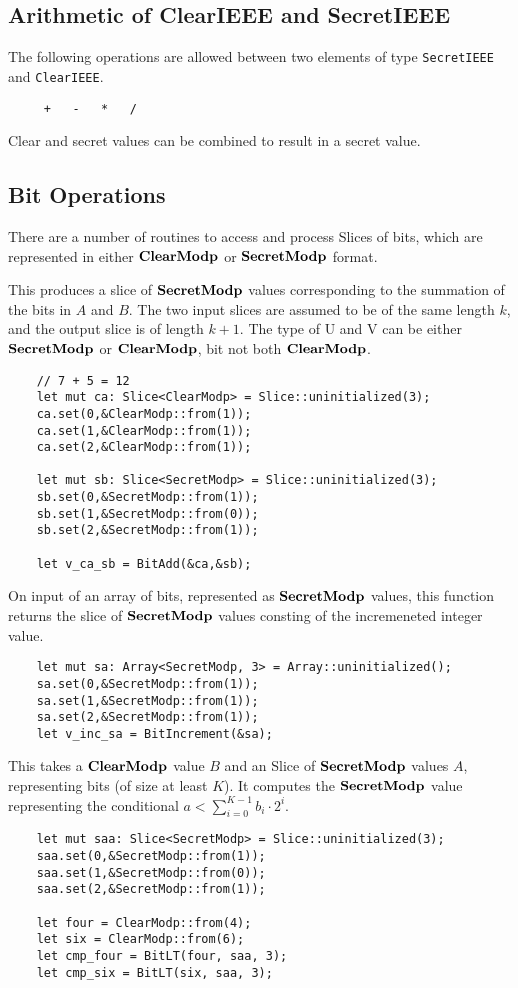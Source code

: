 \subsection{Arithmetic of ClearIEEE and SecretIEEE}
The following operations are allowed between two elements of type 
\verb|SecretIEEE| and \verb|ClearIEEE|.
\begin{verbatim}
     +   -   *   /
\end{verbatim}
Clear and secret values can be combined to result in a secret value.

\subsection{Bit Operations}
There are a number of routines to access and process Slices of bits,
which are represented in either $\mathbf{ClearModp}$ or $\mathbf{SecretModp}$ format.

This produces a slice of $\mathbf{SecretModp}$ values corresponding to the
summation of the bits in $A$ and $B$. The two input slices are assumed
to be of the same length $k$, and the output slice is of length $k+1$.
The type of U and V can be either $\mathbf{SecretModp}$ or $\mathbf{ClearModp}$,
bit not both $\mathbf{ClearModp}$.
\begin{lstlisting}
    // 7 + 5 = 12
    let mut ca: Slice<ClearModp> = Slice::uninitialized(3);
    ca.set(0,&ClearModp::from(1));
    ca.set(1,&ClearModp::from(1));
    ca.set(2,&ClearModp::from(1));

    let mut sb: Slice<SecretModp> = Slice::uninitialized(3);
    sb.set(0,&SecretModp::from(1));
    sb.set(1,&SecretModp::from(0));
    sb.set(2,&SecretModp::from(1));

    let v_ca_sb = BitAdd(&ca,&sb);
\end{lstlisting}

On input of an array of bits, represented as $\mathbf{SecretModp}$ values,
this function returns the slice of $\mathbf{SecretModp}$ values consting
of the incremeneted integer value.
\begin{lstlisting}
    let mut sa: Array<SecretModp, 3> = Array::uninitialized();
    sa.set(0,&SecretModp::from(1));
    sa.set(1,&SecretModp::from(1));
    sa.set(2,&SecretModp::from(1));
    let v_inc_sa = BitIncrement(&sa);
\end{lstlisting}

This takes a $\mathbf{ClearModp}$ value $B$ and an Slice of $\mathbf{SecretModp}$
values $A$, representing bits (of size at least $K$).
It computes the $\mathbf{SecretModp}$ value representing the conditional
$a < \sum_{i=0}^{K-1} b_i \cdot 2^i$.
\begin{lstlisting}
    let mut saa: Slice<SecretModp> = Slice::uninitialized(3);
    saa.set(0,&SecretModp::from(1));
    saa.set(1,&SecretModp::from(0));
    saa.set(2,&SecretModp::from(1));

    let four = ClearModp::from(4);
    let six = ClearModp::from(6);
    let cmp_four = BitLT(four, saa, 3);
    let cmp_six = BitLT(six, saa, 3);
\end{lstlisting}

